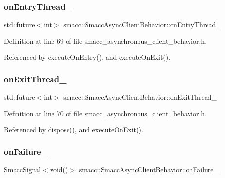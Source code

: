 \subsubsection{\texorpdfstring{on\+Entry\+Thread\+\_\+}{onEntryThread\_}}
{\footnotesize\ttfamily std\+::future$<$int$>$ smacc\+::\+Smacc\+Async\+Client\+Behavior\+::on\+Entry\+Thread\+\_\+\hspace{0.3cm}{\ttfamily [private]}}



Definition at line 69 of file smacc\+\_\+asynchronous\+\_\+client\+\_\+behavior.\+h.



Referenced by execute\+On\+Entry(), and execute\+On\+Exit().

\mbox{\label{classsmacc_1_1SmaccAsyncClientBehavior_af76d1c36b4a10425f2da043545b73299}} 
\subsubsection{\texorpdfstring{on\+Exit\+Thread\+\_\+}{onExitThread\_}}
{\footnotesize\ttfamily std\+::future$<$int$>$ smacc\+::\+Smacc\+Async\+Client\+Behavior\+::on\+Exit\+Thread\+\_\+\hspace{0.3cm}{\ttfamily [private]}}



Definition at line 70 of file smacc\+\_\+asynchronous\+\_\+client\+\_\+behavior.\+h.



Referenced by dispose(), and execute\+On\+Exit().

\mbox{\label{classsmacc_1_1SmaccAsyncClientBehavior_a34e6262de21b9fbbabbc466d3180cc18}} 
\subsubsection{\texorpdfstring{on\+Failure\+\_\+}{onFailure\_}}
{\footnotesize\ttfamily \hyperlink{classsmacc_1_1SmaccSignal}{Smacc\+Signal}$<$void()$>$ smacc\+::\+Smacc\+Async\+Client\+Behavior\+::on\+Failure\+\_\+\hspace{0.3cm}{\ttfamily [private]}}



